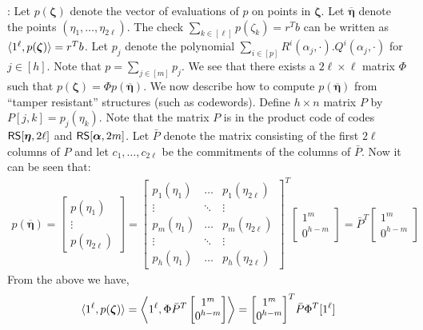 : Let $p(\bm{\zeta})$ denote the vector of
evaluations of $p$ on points in $\bm{\zeta}$. Let $\overline{\bm{\eta}}$ denote
the points $(\eta_1,\ldots,\eta_{2\ell})$. The check $\sum_{k\in
[\ell]}p(\zeta_k)=r^Tb$ can be written as $\langle 1^\ell,p(\bm{\zeta})\rangle=r^Tb$. 
Let $p_j$ denote the polynomial $\sum_{i\in
[p]}R^i(\alpha_j,\cdot).Q^i(\alpha_j,\cdot)$ for $j\in [h]$. Note that
$p=\sum_{j\in [m]}p_j$. We see that there exists a $2\ell\times \ell$ matrix
$\Phi$ such that $p(\bm{\zeta})=\Phi p(\overline{\bm{\eta}})$. We now describe
how to compute $p(\overline{\bm{\eta}})$ from ``tamper resistant'' structures
(such as codewords). Define $h\times n$ matrix $P$ by $P[j,k]=p_j(\eta_k)$. Note
that the matrix $P$ is in the product code of codes $\mathsf{RS}[\bm{\eta},2\ell]$ and
$\mathsf{RS}[\bm{\alpha},2m]$. Let $\bar{P}$ denote the matrix consisting of the first
$2\ell$ columns of $P$ and let $c_1,\ldots,c_{2\ell}$ be the commitments of the
columns of $\bar{P}$. Now it can be seen that:
\begin{align}
p(\overline{\bm{\eta}}) = \begin{bmatrix} p(\eta_1) \\ \vdots \\
p(\eta_{2\ell}) \end{bmatrix} = 
	{\begin{bmatrix}
	p_1(\eta_1) & \hdots & p_1(\eta_{2\ell}) \\
	\vdots & \ddots & \vdots \\
	p_m(\eta_1) & \hdots & p_m(\eta_{2\ell}) \\
	\vdots & \ddots & \vdots \\
	p_h(\eta_1) & \hdots & p_h(\eta_{2\ell})
	\end{bmatrix}}^T
	\begin{bmatrix}
	1^m \\
	0^{h-m}
	\end{bmatrix}=\bar{P}^T\begin{bmatrix} 1^m \\ 0^{h-m}\end{bmatrix}
\end{align}
From the above we have, 
\begin{align}\label{eq:necessarycondlin}
\langle 1^\ell,p(\bm{\zeta})\rangle = \left\langle 1^\ell, \Phi\bar{P}^T\begin{bmatrix}
1^m \\ 0^{h-m} \end{bmatrix}\right\rangle = {\begin{bmatrix} 1^m \\ 0^{h-m}
\end{bmatrix}}^T\bar{P}\Phi^T[1^\ell]
\end{align}

